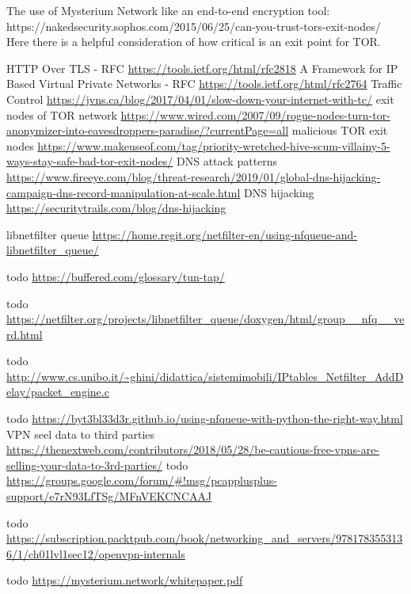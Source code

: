 \documentclass[12pt]{article}
\begin{document}
	The use of Mysterium Network like an end-to-end encryption tool: https://nakedsecurity.sophos.com/2015/06/25/can-you-trust-tors-exit-nodes/
	Here there is a helpful consideration of how critical is an exit point for TOR.

	\pagebreak

	
	\begin{thebibliography}{1}
			HTTP Over TLS - RFC
			\url{https://tools.ietf.org/html/rfc2818}
			A Framework for IP Based Virtual Private Networks - RFC
			\url{https://tools.ietf.org/html/rfc2764}
			Traffic Control
			\url{https://jvns.ca/blog/2017/04/01/slow-down-your-internet-with-tc/}
			exit nodes of TOR network
			\url{https://www.wired.com/2007/09/rogue-nodes-turn-tor-anonymizer-into-eavesdroppers-paradise/?currentPage=all}
			malicious TOR exit nodes
			\url{https://www.makeuseof.com/tag/priority-wretched-hive-scum-villainy-5-ways-stay-safe-bad-tor-exit-nodes/}
			DNS attack patterns
			\url{https://www.fireeye.com/blog/threat-research/2019/01/global-dns-hijacking-campaign-dns-record-manipulation-at-scale.html}
			DNS hijacking
			\url{https://securitytrails.com/blog/dns-hijacking}

			libnetfilter queue
			\url{https://home.regit.org/netfilter-en/using-nfqueue-and-libnetfilter_queue/}
		
			todo
			\url{https://buffered.com/glossary/tun-tap/}
		
			todo
			\url{https://netfilter.org/projects/libnetfilter_queue/doxygen/html/group__nfq__verd.html}

		todo
			\url{http://www.cs.unibo.it/~ghini/didattica/sistemimobili/IPtables_Netfilter_AddDelay/packet_engine.c}

		todo
			\url{https://byt3bl33d3r.github.io/using-nfqueue-with-python-the-right-way.html}
			VPN seel data to third parties
			\url{https://thenextweb.com/contributors/2018/05/28/be-cautious-free-vpns-are-selling-your-data-to-3rd-parties/}
		todo
			\url{https://groups.google.com/forum/#!msg/pcapplusplus-support/e7rN93LfTSg/MFnVEKCNCAAJ}

		todo
			\url{https://subscription.packtpub.com/book/networking_and_servers/9781783553136/1/ch01lvl1sec12/openvpn-internals}

		todo
			\url{https://mysterium.network/whitepaper.pdf}


\end{thebibliography}
\end{document}
